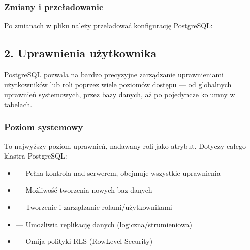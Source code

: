 \documentclass[a4paper,11pt,openany,english]{sphinxmanual}
\begin{document}
\subsubsection{Zmiany i przeładowanie}
\label{\detokenize{rozdzial2/Bezpieczenstwo/index:zmiany-i-przeladowanie}}
\sphinxAtStartPar
Po zmianach w pliku należy przeładować konfigurację PostgreSQL:

\begin{sphinxVerbatim}[commandchars=\\\{\}]
 
 
 
\end{sphinxVerbatim}


\subsection{2. Uprawnienia użytkownika}
\label{\detokenize{rozdzial2/Bezpieczenstwo/index:uprawnienia-uzytkownika}}
\sphinxAtStartPar
PostgreSQL pozwala na bardzo precyzyjne zarządzanie uprawnieniami użytkowników lub roli poprzez wiele poziomów dostępu — od globalnych uprawnień systemowych, przez bazy danych, aż po pojedyncze kolumny w tabelach.


\subsubsection{Poziom systemowy}
\label{\detokenize{rozdzial2/Bezpieczenstwo/index:poziom-systemowy}}
\sphinxAtStartPar
To najwyższy poziom uprawnień, nadawany roli jako atrybut. Dotyczy całego klastra PostgreSQL:
\begin{itemize}
\item {} 
\sphinxAtStartPar
{} — Pełna kontrola nad serwerem, obejmuje wszystkie uprawnienia

\item {} 
\sphinxAtStartPar
{} — Możliwość tworzenia nowych baz danych

\item {} 
\sphinxAtStartPar
{} — Tworzenie i zarządzanie rolami/użytkownikami

\item {} 
\sphinxAtStartPar
{} — Umożliwia replikację danych (logiczna/strumieniowa)

\item {} 
\sphinxAtStartPar
{} — Omija polityki RLS (Row\sphinxhyphen{}Level Security)

\end{itemize}
\end{document}
